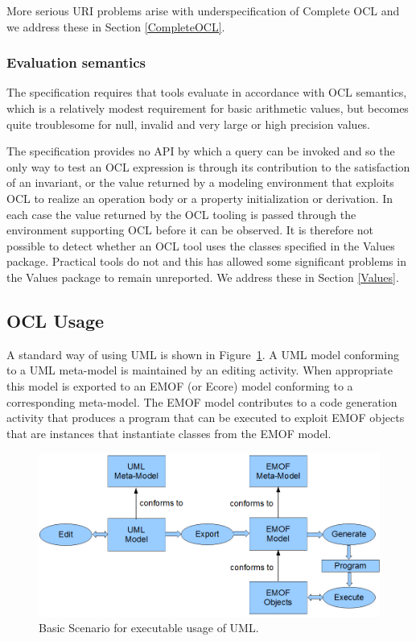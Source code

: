 \documentclass{eceasst}
\begin{document}
More serious URI problems arise with underspecification of Complete OCL and we address these in Section \ref{CompleteOCL}.

\subsubsection{Evaluation semantics}

The specification requires that tools evaluate in accordance with OCL semantics, which is a relatively modest requirement for basic arithmetic values, but becomes quite troublesome for null, invalid and very large or high precision values.

The specification provides no API by which a query can be invoked and so the only way to test an OCL expression is through its contribution to the satisfaction of an invariant, or the value returned by a modeling environment that exploits OCL to realize an operation body or a property initialization or derivation. In each case the value returned by the OCL tooling is passed through the environment supporting OCL before it can be observed. It is therefore not possible to detect whether an OCL tool uses the classes specified in the Values package. Practical tools do not and this has allowed some significant problems in the Values package to remain unreported. We address these in Section \ref{Values}.
 
\subsection{OCL Usage}

A standard way of using UML is shown in Figure~\ref{fig:BasicScenario}. A UML model conforming to a UML meta-model is maintained by an editing activity. When appropriate this model is exported to an EMOF (or Ecore) model conforming to a corresponding meta-model. The EMOF model contributes to a code generation activity that produces a program that can be executed to exploit EMOF objects that are instances that instantiate classes from the EMOF model.

\begin{figure}
  \begin{center}
    \includegraphics[width=5.75in]{BasicScenario.png}
  \end{center}
  \caption{Basic Scenario for executable usage of UML.}
  \label{fig:BasicScenario}
\end{figure}
\end{document}
